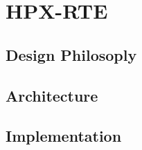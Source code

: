 \chapter{HPX-RTE}
\label{sec:HPX-RTE}

\section{Design Philosoply}
\section{Architecture}
\section{Implementation}

